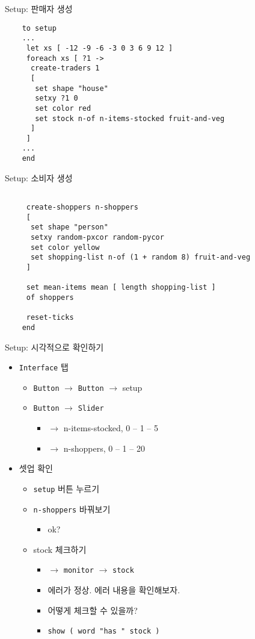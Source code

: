 \documentclass[hyperref={unicode}]{beamer}
\begin{document}
\begin{frame}[fragile]{Setup: 판매자 생성}
\begin{verbatim}
	to setup
	...
	 let xs [ -12 -9 -6 -3 0 3 6 9 12 ]
	 foreach xs [ ?1 ->
	  create-traders 1
	  [
	   set shape "house"
	   setxy ?1 0
	   set color red
	   set stock n-of n-items-stocked fruit-and-veg
	  ]
	 ]
	...  
	end	  
\end{verbatim}	
\end{frame}

\begin{frame}[fragile]{Setup: 소비자 생성}
\begin{verbatim}
	
     create-shoppers n-shoppers
     [
      set shape "person"
      setxy random-pxcor random-pycor
      set color yellow
      set shopping-list n-of (1 + random 8) fruit-and-veg 
     ]
     
     set mean-items mean [ length shopping-list ] 
     of shoppers
	 
	 reset-ticks  
	end	  
\end{verbatim}	
\end{frame}

\begin{frame}[fragile]{Setup: 시각적으로 확인하기}
\begin{itemize}
\item \verb|Interface| 탭
	\begin{itemize}
	\item \verb|Button| $\rightarrow$ \verb|Button| $\rightarrow$ setup
	\item \verb|Button| $\rightarrow$ \verb|Slider| 
		\begin{itemize}
		\item $\rightarrow$ n-items-stocked, 0 -- 1 -- 5
		\item $\rightarrow$ n-shoppers, 0 -- 1 -- 20
		\end{itemize}
	\end{itemize}
\item 셋업 확인
	\begin{itemize}
	\item \verb|setup| 버튼 누르기
	\item \verb|n-shoppers| 바꿔보기
		\begin{itemize}
		\item ok?
		\end{itemize}
	\item stock 체크하기 
		\begin{itemize}
		\item $\rightarrow$  \verb|monitor| $\rightarrow$  \verb|stock| 
		\item 에러가 정상. 에러 내용을 확인해보자.
		\item 어떻게 체크할 수 있을까?
		\item \verb|show ( word "has " stock )|
		\end{itemize}
	\end{itemize}
\end{itemize}	
\end{frame}
\end{document}
